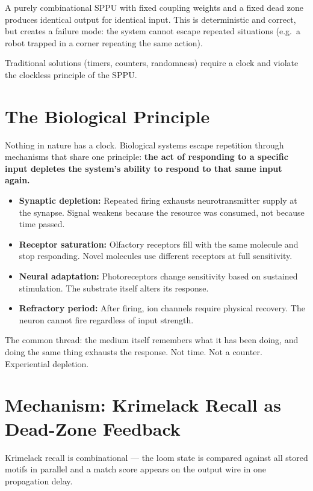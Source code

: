 \documentclass[11pt, a4paper]{report}
\begin{document}
A purely combinational SPPU with fixed coupling weights and a fixed dead
zone produces identical output for identical input. This is deterministic
and correct, but creates a failure mode: the system cannot escape repeated
situations (e.g.\ a robot trapped in a corner repeating the same action).

Traditional solutions (timers, counters, randomness) require a clock and
violate the clockless principle of the SPPU.

\section{The Biological Principle}

Nothing in nature has a clock. Biological systems escape repetition through
mechanisms that share one principle: \textbf{the act of responding to a
specific input depletes the system's ability to respond to that same input
again.}

\begin{itemize}[nosep]
  \item \textbf{Synaptic depletion:} Repeated firing exhausts neurotransmitter
        supply at the synapse. Signal weakens because the resource was consumed,
        not because time passed.
  \item \textbf{Receptor saturation:} Olfactory receptors fill with the same
        molecule and stop responding. Novel molecules use different receptors
        at full sensitivity.
  \item \textbf{Neural adaptation:} Photoreceptors change sensitivity based on
        sustained stimulation. The substrate itself alters its response.
  \item \textbf{Refractory period:} After firing, ion channels require physical
        recovery. The neuron cannot fire regardless of input strength.
\end{itemize}

The common thread: the medium itself remembers what it has been doing, and
doing the same thing exhausts the response. Not time. Not a counter.
Experiential depletion.

\section{Mechanism: Krimelack Recall as Dead-Zone Feedback}

Krimelack recall is combinational --- the loom state is compared against all
stored motifs in parallel and a match score appears on the output wire in
one propagation delay.
\end{document}
